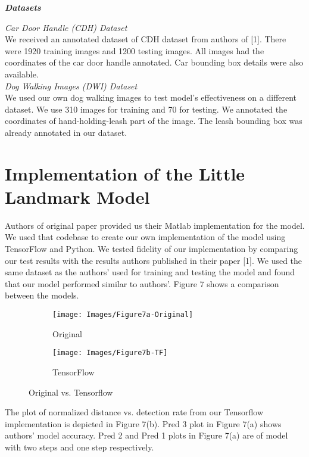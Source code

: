 \documentclass [11pt,letterpaper ,twoside ,openany ]{report}
\begin{document}
    \noindent
    \textbf{\textit{Datasets}}

    \noindent
    \textit{Car Door Handle (CDH) Dataset}\\
    We received an annotated dataset of CDH dataset from authors of [1]. There were 1920 training images and 1200 testing images. All images had the coordinates of the car door handle annotated. Car bounding box details were also available.\\

    \noindent
    \textit{Dog Walking Images (DWI) Dataset}\\
    We used our own dog walking images to test model's effectiveness on a different dataset. We use 310 images for training and 70 for testing. We annotated the coordinates of hand-holding-leash part of the image. The leash bounding box was already annotated in our dataset.

    \chapter{Implementation of the Little Landmark Model}
    \doublespacing
    Authors of original paper provided us their Matlab implementation for the model. We used that codebase to create our own implementation of the model using TensorFlow\textsuperscript{\textregistered} and Python. We tested fidelity of our implementation by comparing our test results with the results authors published in their paper [1]. We used the same dataset as the authors' used for training and testing the model and found that our model performed similar to authors'. Figure 7 shows a comparison between the models. \\

    \begin{figure}[h!]
    \centering
        \begin{subfigure}[b]{0.49\linewidth}
            \texttt{[image: Images/Figure7a-Original]}
            \caption{Original}
        \end{subfigure}
        \begin{subfigure}[b]{0.49\linewidth}
            \texttt{[image: Images/Figure7b-TF]}
            \caption{TensorFlow}
        \end{subfigure}
        \caption{Original vs. Tensorflow}
        \label{fig:coffee}
    \end{figure}

    The plot of normalized distance vs. detection rate from our Tensorflow implementation is depicted in Figure 7(b). Pred 3 plot in Figure 7(a) shows authors' model accuracy. Pred 2 and Pred 1 plots in Figure 7(a) are of model with two steps and one step respectively.\\\\
\end{document}
